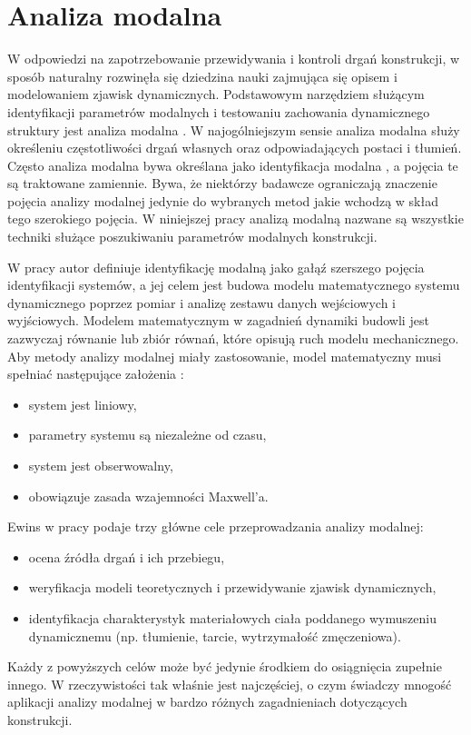 \section{Analiza modalna}
W odpowiedzi na zapotrzebowanie przewidywania i kontroli drgań konstrukcji, w sposób naturalny rozwinęła się dziedzina nauki zajmująca się opisem i modelowaniem zjawisk dynamicznych. Podstawowym narzędziem służącym identyfikacji parametrów modalnych i testowaniu zachowania dynamicznego struktury jest analiza modalna . W najogólniejszym sensie analiza modalna służy określeniu częstotliwości drgań własnych oraz odpowiadających postaci i tłumień. Często analiza modalna bywa określana jako identyfikacja modalna , a pojęcia te są traktowane zamiennie. Bywa, że niektórzy badawcze ograniczają znaczenie pojęcia analizy modalnej jedynie do wybranych metod jakie wchodzą w skład tego szerokiego pojęcia. W niniejszej pracy analizą modalną nazwane są wszystkie techniki służące poszukiwaniu parametrów modalnych konstrukcji.

W pracy \parencite{Zhang2004} autor definiuje identyfikację modalną jako gałąź szerszego pojęcia identyfikacji systemów, a jej celem jest budowa modelu matematycznego systemu dynamicznego poprzez pomiar i analizę zestawu danych wejściowych i wyjściowych. Modelem matematycznym w zagadnień dynamiki budowli jest zazwyczaj równanie lub zbiór równań, które opisują ruch modelu mechanicznego. Aby metody analizy modalnej miały zastosowanie, model matematyczny musi spełniać następujące założenia \parencite{Maia1997}:
\begin{itemize}
	\item system jest liniowy,
	\item parametry systemu są niezależne od czasu,
	\item system jest obserwowalny,
	\item obowiązuje zasada wzajemności Maxwell'a.
\end{itemize}

Ewins w  pracy \cite{Ewins2000} podaje trzy główne cele przeprowadzania analizy modalnej:
\begin{itemize}
	\item ocena źródła drgań i ich przebiegu,
	\item weryfikacja modeli teoretycznych i przewidywanie zjawisk dynamicznych,
	\item identyfikacja charakterystyk materiałowych ciała poddanego wymuszeniu dynamicznemu (np. tłumienie, tarcie, wytrzymałość zmęczeniowa). 
\end{itemize}
Każdy z powyższych celów może być jedynie środkiem do osiągnięcia zupełnie innego. W rzeczywistości tak właśnie jest najczęściej, o czym świadczy mnogość aplikacji analizy modalnej w bardzo różnych zagadnieniach dotyczących konstrukcji. 


